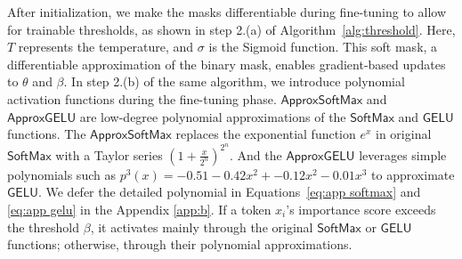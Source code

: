 After initialization, we make the masks differentiable during fine-tuning to allow for trainable thresholds, as shown in step 2.(a) of Algorithm~\ref{alg:threshold}. Here, \(T\) represents the temperature, and \(\sigma\) is the Sigmoid function. This soft mask, a differentiable approximation of the binary mask, enables gradient-based updates to \(\theta\) and \(\beta\). In step 2.(b) of the same algorithm, we introduce polynomial activation functions during the fine-tuning phase. \(\mathsf{ApproxSoftMax}\) and \(\mathsf{ApproxGELU}\) are low-degree polynomial approximations of the \(\mathsf{SoftMax}\) and \(\mathsf{GELU}\) functions. {The $\mathsf{ApproxSoftMax}$ replaces the exponential function $e^x$ in original $\mathsf{SoftMax}$ with a Taylor series $(1+ \frac{x}{2^n})^{2^n}$. And the $\mathsf{ApproxGELU}$ leverages simple polynomials such as $p^3(x) = -0.51-0.42x^2 + -0.12x^2 - 0.01x^3$ to approximate $\mathsf{GELU}$. We defer the detailed polynomial in Equations~\ref{eq:app softmax} and \ref{eq:app gelu} in the Appendix \ref{app:b}.} If a token \(x_i\)'s importance score exceeds the threshold \(\beta\), it activates mainly through the original \(\mathsf{SoftMax}\) or \(\mathsf{GELU}\) functions; otherwise, through their polynomial approximations.


